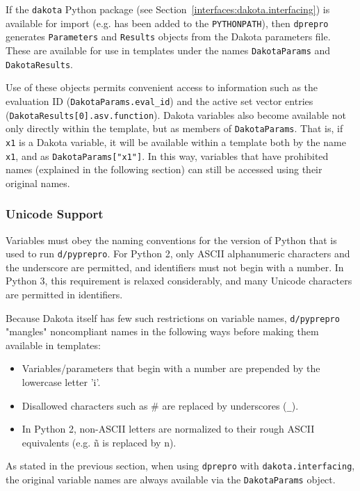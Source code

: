 {If the \texttt{dakota} Python package (see 
Section~\ref{interfaces:dakota.interfacing}) is available for import (e.g. has
been added to the \texttt{PYTHONPATH}), then \texttt{dprepro} generates 
\texttt{Parameters} and \texttt{Results} objects from the Dakota parameters 
file. These are available for use in templates under the names 
\texttt{DakotaParams} and \texttt{DakotaResults}.

Use of these objects permits convenient access to information such as the 
evaluation ID (\texttt{DakotaParams.eval\_id}) and the active set vector 
entries (\texttt{DakotaResults[0].asv.function}). Dakota 
variables also become available not only directly within the template, but as 
members of \texttt{DakotaParams}. That is, if  \texttt{x1} is a Dakota variable,
it will be available within a template both by the name \texttt{x1}, and as 
\texttt{DakotaParams["x1"]}. In this way, variables that have prohibited names
(explained in the following section) can still be accessed using their original 
names.

\subsubsection{Unicode Support}\label{interfaces:unicode}

Variables must obey the naming conventions for the version of Python that is
used to run \texttt{d/pyprepro}. For Python 2, only ASCII alphanumeric
characters and the underscore are permitted, and identifiers must not begin
with a number. In Python 3, this requirement is relaxed considerably, and
many Unicode characters are permitted in identifiers.

Because Dakota itself has few such restrictions on variable names,
\texttt{d/pyprepro} "mangles" noncompliant names in the following ways
before making them available in templates:
\begin{itemize}
 \item Variables/parameters that begin with a number are prepended by the lowercase
	 letter 'i'.
 \item Disallowed characters such as \# are replaced by underscores (\texttt{\_}).
 \item In Python 2, non-ASCII letters are normalized to their rough ASCII
	 equivalents (e.g. ñ is replaced by n).
\end{itemize}

As stated in the previous section, when using \texttt{dprepro} with 
\texttt{dakota.interfacing}, the original variable names are always available
via the \texttt{DakotaParams} object.

}
